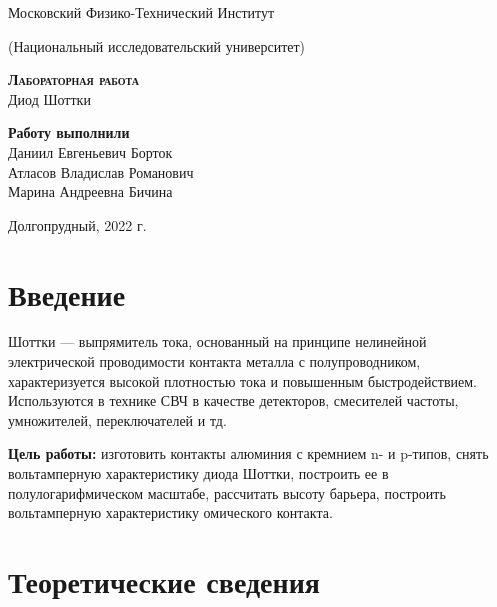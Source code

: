 \documentclass[12pt,a4paper]{article}
\begin{document}
 
\begin{titlepage}
  \begin{center}
    \large
    Московский Физико-Технический Институт
    
    (Национальный исследовательский университет)
    \vspace{0.5cm}

   
    \vspace{0.25cm}
 
    \vfill
 
    \vfill

    \textsc{\bf{Лабораторная работа}}\\[5mm]
    
    {\LARGE Диод Шоттки}
  \bigskip
    \vfill
    
\end{center}
\vfill
\begin{flushright}

    \textbf{Работу выполнили} \\
    Даниил Евгеньевич Борток \\
    Атласов Владислав Романович\\
    Марина Андреевна Бичина\\

\end{flushright}

\bigskip


\vfill

\begin{center}
  Долгопрудный, 2022 г.
\end{center}
\end{titlepage}
\section*{Введение}
 Шоттки — выпрямитель тока, основанный на принципе нелинейной электрической проводимости контакта металла с полупроводником, характеризуется высокой
плотностью тока и повышенным быстродействием. Используются в технике СВЧ в качестве детекторов, смесителей частоты, умножителей, переключателей и тд.

\noindent\textbf{Цель работы: }изготовить контакты алюминия с кремнием n- и p-типов, снять  вольтамперную характеристику диода Шоттки, построить ее в полулогарифмическом масштабе, рассчитать высоту барьера, построить вольтамперную характеристику омического контакта.
\section{Теоретические сведения}
\end{document}
